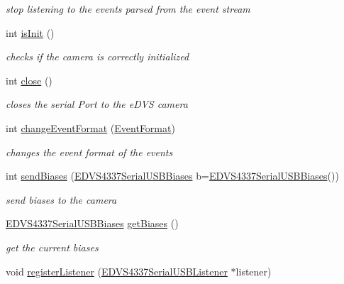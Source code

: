 \begin{DoxyCompactItemize}
\begin{DoxyCompactList}\small\item\em stop listening to the events parsed from the event stream \end{DoxyCompactList}\item 
int \hyperlink{class_e_d_v_s4337_serial_u_s_b_aebb4071c2c8b81771460e8381016c3a0}{is\+Init} ()
\begin{DoxyCompactList}\small\item\em checks if the camera is correctly initialized \end{DoxyCompactList}\item 
\hypertarget{class_e_d_v_s4337_serial_u_s_b_a3d1cfe0acb88ab31523477519df51f17}{}int \hyperlink{class_e_d_v_s4337_serial_u_s_b_a3d1cfe0acb88ab31523477519df51f17}{close} ()\label{class_e_d_v_s4337_serial_u_s_b_a3d1cfe0acb88ab31523477519df51f17}

\begin{DoxyCompactList}\small\item\em closes the serial Port to the e\+D\+V\+S camera \end{DoxyCompactList}\item 
int \hyperlink{class_e_d_v_s4337_serial_u_s_b_a34bbef40b445d99ea326fda021235079}{change\+Event\+Format} (\hyperlink{_e_b_v___e_d_v_s4337_serial_u_s_b_8h_a2b0bc356728b430ea3809f44d9be46c1}{Event\+Format})
\begin{DoxyCompactList}\small\item\em changes the event format of the events \end{DoxyCompactList}\item 
int \hyperlink{class_e_d_v_s4337_serial_u_s_b_af09e53dfaa5b511faf6992e47aa8b970}{send\+Biases} (\hyperlink{struct_e_d_v_s4337_serial_u_s_b_biases}{E\+D\+V\+S4337\+Serial\+U\+S\+B\+Biases} b=\hyperlink{struct_e_d_v_s4337_serial_u_s_b_biases}{E\+D\+V\+S4337\+Serial\+U\+S\+B\+Biases}())
\begin{DoxyCompactList}\small\item\em send biases to the camera \end{DoxyCompactList}\item 
\hypertarget{class_e_d_v_s4337_serial_u_s_b_a327ddd8ac04b7e69ba01bd90ae49f040}{}\hyperlink{struct_e_d_v_s4337_serial_u_s_b_biases}{E\+D\+V\+S4337\+Serial\+U\+S\+B\+Biases} \hyperlink{class_e_d_v_s4337_serial_u_s_b_a327ddd8ac04b7e69ba01bd90ae49f040}{get\+Biases} ()\label{class_e_d_v_s4337_serial_u_s_b_a327ddd8ac04b7e69ba01bd90ae49f040}

\begin{DoxyCompactList}\small\item\em get the current biases \end{DoxyCompactList}\item 
\hypertarget{class_e_d_v_s4337_serial_u_s_b_a205afab634036c014dcb84184746635c}{}void \hyperlink{class_e_d_v_s4337_serial_u_s_b_a205afab634036c014dcb84184746635c}{register\+Listener} (\hyperlink{class_e_d_v_s4337_serial_u_s_b_listener}{E\+D\+V\+S4337\+Serial\+U\+S\+B\+Listener} $\ast$listener)\label{class_e_d_v_s4337_serial_u_s_b_a205afab634036c014dcb84184746635c}


\end{DoxyCompactItemize}
